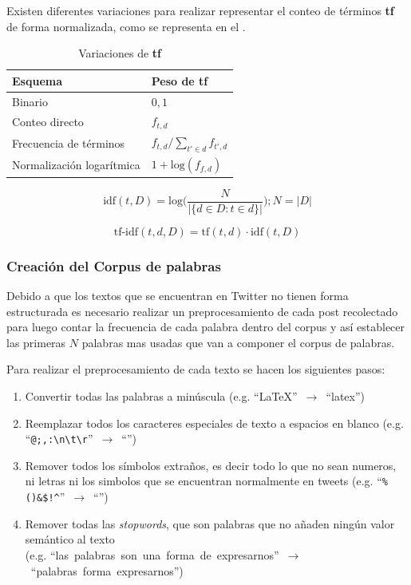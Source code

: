 Existen diferentes variaciones para realizar representar el conteo de términos \textbf{tf} de forma normalizada, como se representa en el .

\begin{table}[h!]
\centering
\begin{tabular}{|l|l|} \hline
  \textbf{Esquema}          & \textbf{Peso de tf} \\ \hline
  Binario                   & $0, 1$ \\ \hline
  Conteo directo            & $f_{t, d}$ \\ \hline
  Frecuencia de términos    & $f_{t, d} / \sum_{t' \in d}f_{t', d}$ \\ \hline
  Normalización logarítmica & $1 + \text{log}(f_{f, d})$ \\ \hline
\end{tabular}
\caption{Variaciones de \textbf{tf}}
\label{table:tf}
\end{table}

\begin{equation} \label{eq:idf-repr}
  \text{idf}(t, D) = \text{log}\Bigg( \frac{N}{|\{d \in D : t \in d\}|} \Bigg) ; N = |D|
\end{equation}

\begin{equation} \label{eq:tfidf-repr}
  \text{tf-idf}(t, d, D) = \text{tf}(t, d) \cdot \text{idf}(t, D)
\end{equation}

\subsubsection{Creación del Corpus de palabras}
Debido a que los textos que se encuentran en Twitter no tienen forma estructurada es necesario realizar un preprocesamiento de cada post recolectado para luego contar la frecuencia de cada palabra dentro del corpus y así establecer las primeras $N$ palabras mas usadas que van a componer el corpus de palabras.

Para realizar el preprocesamiento de cada texto se hacen los siguientes pasos:
\begin{enumerate}
\item Convertir todas las palabras a minúscula (e.g. \mbox{``LaTeX'' $\rightarrow$ ``latex''})
\item Reemplazar todos los caracteres especiales de texto a espacios en blanco (e.g. \mbox{``\texttt{@;,:\textbackslash n\textbackslash t\textbackslash r}'' $\rightarrow$ ``\textvisiblespace \textvisiblespace \textvisiblespace \textvisiblespace \textvisiblespace \textvisiblespace \textvisiblespace''})
\item Remover todos los símbolos extraños, es decir todo lo que no sean numeros, ni letras ni los simbolos que se encuentran normalmente en tweets (e.g. \mbox{``\texttt{\%()\*\&\$!\^}'' $\rightarrow$ ``''})
\item Remover todas las \emph{stopwords}, que son palabras que no añaden ningún valor semántico al texto \\ (e.g. \mbox{``las palabras son una forma de expresarnos'' $\rightarrow$ ``palabras forma expresarnos''})
\end{enumerate}

